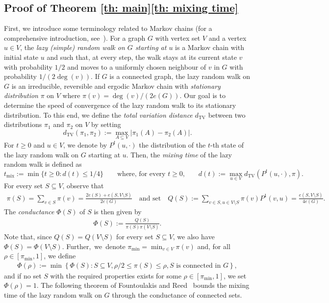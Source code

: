 \documentclass[reqno,final,a4paper]{amsart}
\theoremstyle{definition}
\newcommand{\dtv}{d_{\mathrm{TV}}}
\newcommand{\tmix}{t_{\mathrm{mix}}}
\newcommand{\1}{\mathbbm{1}}
\begin{document}
\subsection{Proof of Theorem \ref{th: main}\ref{th: mixing time}}\label{subsec: mixing}
First, we introduce some terminology related to Markov chains (for a comprehensive introduction, see~\cite{LPW17}). 
For a graph $G$ with vertex set $V$ and a vertex $u\in V$, the \emph{lazy (simple) random walk on $G$ starting at $u$} is a Markov chain with initial state $u$ and such that, 
at every step, the walk stays at its current state $v$ with probability $1/2$ and moves to a uniformly chosen neighbour of $v$ in $G$ with probability $1/(2\deg(v))$. 
If $G$ is a connected graph, the lazy random walk on $G$ is an irreducible, reversible and ergodic Markov chain with \emph{stationary distribution} $\pi$ on $V$ where $\pi(v) = \deg(v)/(2e(G))$.
Our goal is to determine the speed of convergence of the lazy random walk to its stationary distribution.
To this end, we define the \emph{total variation distance} $\dtv$ between two distributions $\pi_1$ and $\pi_2$ on $V$ by setting 
\[
\dtv(\pi_1,\pi_2):=\max_{A\subseteq V}|\pi_1(A)-\pi_2(A)|.
\]
For $t\ge 0$ and $u\in V$, we denote by $P^t(u,\cdot)$ the distribution of the $t$-th state of the lazy random walk on $G$ starting at $u$.
Then, the \textit{mixing time} of the lazy random walk is defined as
\[\tmix:=\min\{t\ge 0:d(t)\le 1/4\}\qquad\text{where, for every $t\ge 0$,}\qquad d(t):= \max_{u\in V}\dtv(P^t(u,\cdot),\pi).\]
For every set $S\subseteq V$, observe that
\begin{align*}
\pi(S)=\sum_{v\in S}\pi(v)=\frac{2e(S)+e(S,V\setminus S)}{2e(G)} \quad \text{and set} \quad 
Q(S):=\sum_{v\in S, u\in V\setminus S}\pi(v)P^1(v,u)=\frac{e(S,V\setminus S)}{4e(G)}.
\end{align*}
The \textit{conductance} $\Phi(S)$ of $S$ is then given by
\begin{align*}
    \Phi(S):=\frac{Q(S)}{\pi(S)\pi(V\setminus S)}.
\end{align*}
Note that, since $Q(S)=Q(V\setminus S)$ for every set $S\subseteq V$, we also have $\Phi(S)=\Phi(V\setminus S)$. 
Further,~we~denote $\pi_{\min}=\min_{v\in V} \pi(v)$ and, for all $\rho\in [\pi_{\min},1]$, we define
\begin{align*}
    \Phi(\rho):=\min\left\{\Phi(S): S\subseteq V, \rho/2\le \pi(S)\le \rho, \text{$S$ is connected in } G\right\},
\end{align*}
and if no set $S$ with the required properties exists for some $\rho\in [\pi_{\min},1]$, we set $\Phi(\rho)=1$. The following theorem of Fountoulakis and Reed~\cite{FR07a} bounds the mixing time of the lazy random walk on $G$ through the conductance of connected sets.
\end{document}
